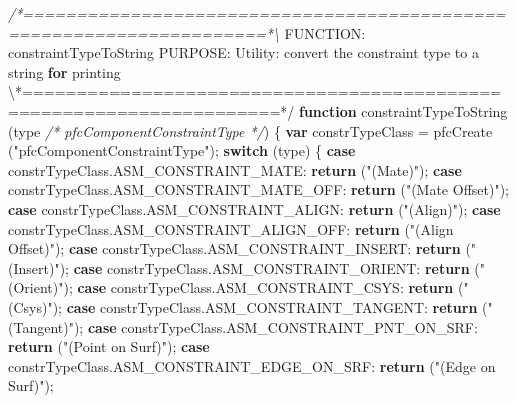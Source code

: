 \documentclass[]{article}
\newenvironment{Shaded}{}{}
\newcommand{\KeywordTok}[1]{\textcolor[rgb]{0.00,0.44,0.13}{\textbf{{#1}}}}
\newcommand{\StringTok}[1]{\textcolor[rgb]{0.25,0.44,0.63}{{#1}}}
\newcommand{\CommentTok}[1]{\textcolor[rgb]{0.38,0.63,0.69}{\textit{{#1}}}}
\newcommand{\OtherTok}[1]{\textcolor[rgb]{0.00,0.44,0.13}{{#1}}}
\newcommand{\FunctionTok}[1]{\textcolor[rgb]{0.02,0.16,0.49}{{#1}}}
\newcommand{\NormalTok}[1]{{#1}}
\begin{document}
\begin{Shaded}
\begin{Highlighting}[]
\CommentTok{/*=====================================================================*\textbackslash{}}
\NormalTok{FUNCTION: constraintTypeToString}
\NormalTok{PURPOSE:  Utility: convert the constraint type to a string }\KeywordTok{for} \NormalTok{printing}
\NormalTok{\textbackslash{}*=====================================================================*}\OtherTok{/}
\KeywordTok{function} \FunctionTok{constraintTypeToString} \NormalTok{(type }\CommentTok{/* pfcComponentConstraintType */}\NormalTok{)}
\NormalTok{\{   }
  \KeywordTok{var} \NormalTok{constrTypeClass = }\FunctionTok{pfcCreate} \NormalTok{(}\StringTok{"pfcComponentConstraintType"}\NormalTok{);}
  \KeywordTok{switch} \NormalTok{(type)}
    \NormalTok{\{}
    \KeywordTok{case} \OtherTok{constrTypeClass}\NormalTok{.}\FunctionTok{ASM_CONSTRAINT_MATE}\NormalTok{:}
      \KeywordTok{return} \NormalTok{(}\StringTok{"(Mate)"}\NormalTok{);        }
    \KeywordTok{case} \OtherTok{constrTypeClass}\NormalTok{.}\FunctionTok{ASM_CONSTRAINT_MATE_OFF}\NormalTok{:}
      \KeywordTok{return} \NormalTok{(}\StringTok{"(Mate Offset)"}\NormalTok{);     }
    \KeywordTok{case} \OtherTok{constrTypeClass}\NormalTok{.}\FunctionTok{ASM_CONSTRAINT_ALIGN}\NormalTok{:}
      \KeywordTok{return} \NormalTok{(}\StringTok{"(Align)"}\NormalTok{);       }
    \KeywordTok{case} \OtherTok{constrTypeClass}\NormalTok{.}\FunctionTok{ASM_CONSTRAINT_ALIGN_OFF}\NormalTok{:}
      \KeywordTok{return} \NormalTok{(}\StringTok{"(Align Offset)"}\NormalTok{);        }
    \KeywordTok{case} \OtherTok{constrTypeClass}\NormalTok{.}\FunctionTok{ASM_CONSTRAINT_INSERT}\NormalTok{:}
      \KeywordTok{return} \NormalTok{(}\StringTok{"(Insert)"}\NormalTok{);      }
    \KeywordTok{case} \OtherTok{constrTypeClass}\NormalTok{.}\FunctionTok{ASM_CONSTRAINT_ORIENT}\NormalTok{:}
      \KeywordTok{return} \NormalTok{(}\StringTok{"(Orient)"}\NormalTok{);      }
    \KeywordTok{case} \OtherTok{constrTypeClass}\NormalTok{.}\FunctionTok{ASM_CONSTRAINT_CSYS}\NormalTok{:}
      \KeywordTok{return} \NormalTok{(}\StringTok{"(Csys)"}\NormalTok{);        }
    \KeywordTok{case} \OtherTok{constrTypeClass}\NormalTok{.}\FunctionTok{ASM_CONSTRAINT_TANGENT}\NormalTok{:}
      \KeywordTok{return} \NormalTok{(}\StringTok{"(Tangent)"}\NormalTok{);     }
    \KeywordTok{case} \OtherTok{constrTypeClass}\NormalTok{.}\FunctionTok{ASM_CONSTRAINT_PNT_ON_SRF}\NormalTok{:}
      \KeywordTok{return} \NormalTok{(}\StringTok{"(Point on Surf)"}\NormalTok{);       }
    \KeywordTok{case} \OtherTok{constrTypeClass}\NormalTok{.}\FunctionTok{ASM_CONSTRAINT_EDGE_ON_SRF}\NormalTok{:}
      \KeywordTok{return} \NormalTok{(}\StringTok{"(Edge on Surf)"}\NormalTok{);        }

\end{Highlighting}
\end{Shaded}
\end{document}
